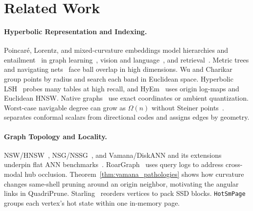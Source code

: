 \section{Related Work}
\label{sec:related}

\paragraph{Hyperbolic Representation and Indexing.}
{Poincar\'e}, {Lorentz}, and mixed-curvature embeddings model hierarchies and entailment~\cite{nickel2017poincare,sala2018representation,ganea2018hyperbolic,ganea2018entailment,tifrea2019poincare,nickel2018lorentz,gu2019mixed} in graph learning~\cite{chami2019hgcn,chami2020low}, vision and language~\cite{chen2022fully,khrulkov2020hyperbolic,ermolov2022hyperbolic,desai2023meru}, and retrieval~\cite{madhu2026hyprag,lewis2020rag}.
Metric trees and navigating nets~\cite{yianilos1993data,krauthgamer2006navigating} face ball overlap in high dimensions. Wu and Charikar~\cite{wu2020hyperbolicnn} group points by radius and search each band in Euclidean space. Hyperbolic {LSH}~\cite{deng2026hyperboliclsh} probes many tables at high recall, and {HyEm}~\cite{deng2026hyem} uses origin log-maps and Euclidean {HNSW}.
Native graphs~\cite{boytsov2013engineering,prokhorenkova2022hyperbolic,glukhota2026hyperspacedb} use exact coordinates or ambient quantization. Worst-case navigable degree can grow as $\Omega(n)$ without Steiner points~\cite{deng2026navigable}. \rquiver{} separates conformal scalars from directional codes and assigns edges by geometry.

\paragraph{Graph Topology and Locality.}
{NSW}/{HNSW}~\cite{malkov2014approximate,malkov2020hnsw}, {NSG}/{NSSG}~\cite{fu2019nsg,fu2022high}, and {Vamana}/{DiskANN} and its extensions~\cite{subramanya2019diskann,singh2021freshdiskann,chen2021spann,gollapudi2023filtered} underpin flat {ANN} benchmarks~\cite{aumuller2020annbenchmarks,wang2021comprehensive,simhadri2022results,azizi2025graph}.
{RoarGraph}~\cite{chen2024roargraph} uses query logs to address cross-modal hub occlusion. Theorem~\ref{thm:vamana_pathologies} shows how curvature changes same-shell pruning around an origin neighbor, motivating the angular links in {QuadriPrune}.
{Starling}~\cite{wang2024starling} reorders vertices to pack SSD blocks. \texttt{HotSmPage} groups each vertex's hot state within one in-memory page.

